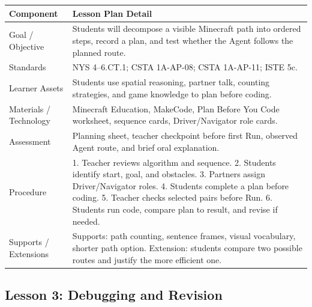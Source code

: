 \documentclass[12pt]{article}
\begin{document}
\begin{xltabular}{\textwidth}{|P{1.45in}|L|}
\hline
{}\color{white}\bfseries Component & \color{white}\bfseries Lesson Plan Detail \\
\hline
Goal / Objective & Students will decompose a visible Minecraft path into ordered steps, record a plan, and test whether the Agent follows the planned route. \\
\hline
{} Standards & NYS 4--6.CT.1; CSTA 1A-AP-08; CSTA 1A-AP-11; ISTE 5c. \\
\hline
Learner Assets & Students use spatial reasoning, partner talk, counting strategies, and game knowledge to plan before coding. \\
\hline
{} Materials / Technology & Minecraft Education, MakeCode, Plan Before You Code worksheet, sequence cards, Driver/Navigator role cards. \\
\hline
Assessment & Planning sheet, teacher checkpoint before first Run, observed Agent route, and brief oral explanation. \\
\hline
{} Procedure & 1. Teacher reviews algorithm and sequence. 2. Students identify start, goal, and obstacles. 3. Partners assign Driver/Navigator roles. 4. Students complete a plan before coding. 5. Teacher checks selected pairs before Run. 6. Students run code, compare plan to result, and revise if needed. \\
\hline
Supports / Extensions & Supports: path counting, sentence frames, visual vocabulary, shorter path option. Extension: students compare two possible routes and justify the more efficient one. \\
\hline
\end{xltabular}

\subsection{Lesson 3: Debugging and Revision}
\end{document}
